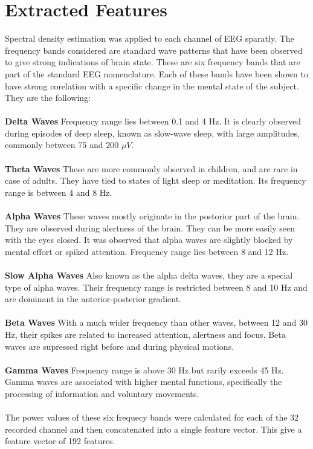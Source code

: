 \documentclass[12pt, a4paper, fleqn]{memoir}%
\begin{document}
\section{Extracted Features}
\label{sec:ExtractedFeatures}
Spectral density estimation was applied to each channel of EEG sparatly. The frequency bands considered are standard wave patterns that have been observed to give strong indications of brain state. These are six frequency bands that are part of the standard EEG nomenclature. Each of these bands have been shown to have strong corelation with a specific change in the mental state of the subject. They are the following:\\
\\
\textbf{Delta Waves} Frequency range lies between 0.1 and 4 Hz. It is clearly observed during episodes of deep sleep, known as slow-wave sleep, with large amplitudes, commonly between 75 and 200 $\mu V$.\\
\\
\textbf{Theta Waves} These are more commonly observed in children, and are rare in case of adults. They have tied to states of light sleep or meditation. Its frequency range is between 4 and 8 Hz.\\
\\
\textbf{Alpha Waves} These waves mostly originate in the postorior part of the brain. They are observed during alertness of the brain. They can be more easily seen with the eyes closed. It was observed that alpha waves are slightly blocked by mental effort or spiked attention. Frequency range lies between 8 and 12 Hz.\\
\\
\textbf{Slow Alpha Waves} Also known as the alpha delta waves, they are a special type of alpha waves. Their frequency range is restricted between 8 and 10 Hz and are dominant in the anterior-posterior gradient.\\
\\
\textbf{Beta Waves} With a much wider frequency than other waves, between 12 and 30 Hz, their spikes are related to increased attention, alertness and focus. Beta waves are supressed right before and during physical motions.\\
\\
\textbf{Gamma Waves} Frequency range is above 30 Hz but rarily exceeds 45 Hz. Gamma waves are associated with higher mental functions, specifically the processing of information and voluntary movements.\\
\\
The power values of these six frequecy bands were calculated for each of the 32 recorded channel and then concatenated into a single feature vector. This give a feature vector of 192 features.
\end{document}
